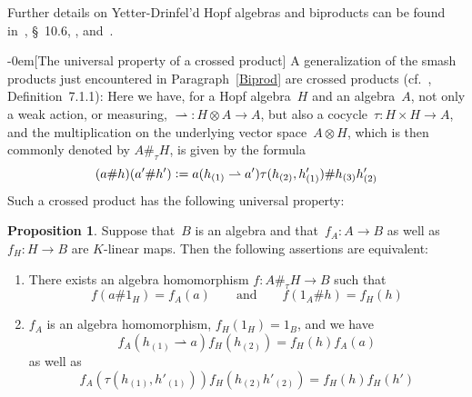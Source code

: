 \documentclass{article}
\makeatletter
\renewcommand{\subsection}{\@startsection{subsection}{2}{0em}%
{\baselineskip}{-0em}{\bfseries\normalsize}}
\newcounter{num}
\newcounter{num1}
\numberwithin{equation}{section}
\theoremstyle{definition}
\newtheorem*{prop}{Proposition}
\theoremstyle{break}
\newcommand{\ot}{\mathbin{\otimes}}
\newcommand{\deq}{\vcentcolon =}
\newcommand{\1}{{(1)}}
\newcommand{\2}{{(2)}}
\newcommand{\3}{{(3)}}
\newcommand{\ra}{\rightarrow}
\newcommand{\A}{1_A}
\newcommand{\B}{1_B}
\newcommand{\HH}{1_H}
\makeatother
\begin{document}
Further details on Yetter-Drinfel'd Hopf algebras and biproducts can be found in~\cite{M}, \S~10.6, \cite{RadfProj}, and~\cite{SoYp}.


\subsection[The universal property of a crossed product]{} \label{UnivPropCross}
A generalization of the smash products just encountered in Paragraph~\ref{Biprod} are crossed products (cf.~\cite{M}, Definition~7.1.1): Here we have, for a Hopf algebra~$H$ and an algebra~$A$, not only a weak action, or measuring, $\rightharpoonup \colon H \ot A \to A$, but also a cocycle~\mbox{$\tau \colon H \times H \to A$}, and the multiplication on the underlying vector space~$A \ot H$, which is then commonly denoted by $A \#_{\tau } H$, is given by the formula
\[(a \# h)(a' \# h') \deq a (h_\1 \rightharpoonup a') \tau(h_\2, h'_\1) \# h_\3 h'_\2\]
Such a crossed product has the following universal property:
\begin{prop}
Suppose that~$B$ is an algebra and that~$f_A \colon A \ra B$ as well as \mbox{$f_H \colon H \ra B$} are $K$-linear maps. Then the following assertions are equivalent:
\begin{enumerate}
\item
There exists an algebra homomorphism $f \colon A \#_{\tau } H \ra B$ such that
$$f(a \# \HH) = f_A(a) \qquad \text{and} \qquad f(\A \# h) = f_H(h)$$

\item
$f_A$ is an algebra homomorphism, $f_H(\HH) = \B$, and we have
$$f_A(h_\1 \rightharpoonup a) f_H(h_\2) = f_H(h) f_A(a)$$
as well as
$$f_A(\tau(h_\1, h'_\1)) f_H(h_\2 h'_\2) = f_H(h) f_H(h')$$
\end{enumerate}
\end{prop}
\end{document}
